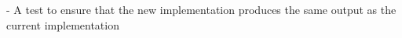 - A test to ensure that the new implementation produces the same output as the current implementation